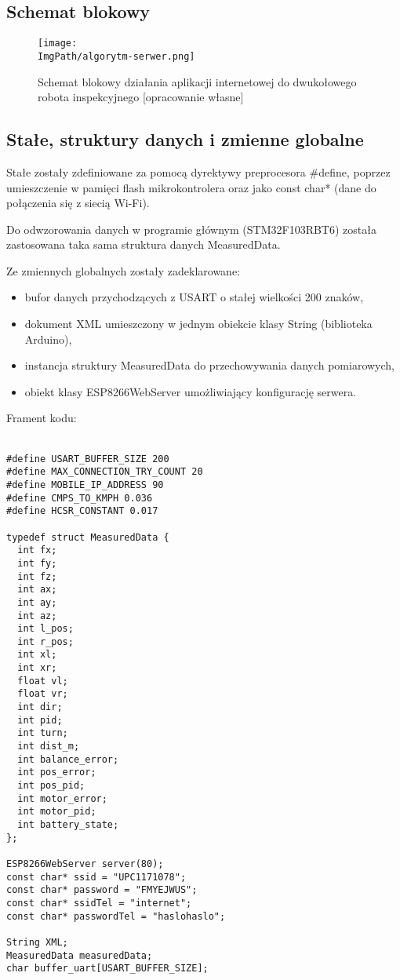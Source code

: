 \documentclass[a4paper,12pt,twoside,openany]{report}
\newcommand{\ImgPath}{.}
\begin{document}
\subsection{Schemat blokowy}

\begin{figure}[!htbp]
	\begin{center}
\centering
\texttt{[image: \\ImgPath/algorytm-serwer.png]}
\end{center}
	\caption{Schemat blokowy działania aplikacji internetowej do dwukołowego robota inspekcyjnego [opracowanie własne]}
	\label{schematKomunikacji}
\end{figure}

\subsection{Stałe, struktury danych i zmienne globalne}

Stałe zostały zdefiniowane za pomocą dyrektywy preprocesora \#define, poprzez umieszczenie w pamięci flash mikrokontrolera oraz jako const char* (dane do połączenia się z siecią Wi-Fi).

Do odwzorowania danych w programie głównym (STM32F103RBT6) została zastosowana taka sama struktura danych MeasuredData.  

Ze zmiennych globalnych zostały zadeklarowane: 
\begin{itemize}
\item bufor danych przychodzących z USART o stałej wielkości 200 znaków,
\item dokument XML umieszczony w jednym obiekcie klasy String (biblioteka Arduino),
\item instancja struktury MeasuredData do przechowywania danych pomiarowych,
\item obiekt klasy ESP8266WebServer umożliwiający konfigurację serwera.
\end{itemize}
Frament kodu:\\
\\
\begin{lstlisting}[style=customcpp]
#define USART_BUFFER_SIZE 200
#define MAX_CONNECTION_TRY_COUNT 20
#define MOBILE_IP_ADDRESS 90
#define CMPS_TO_KMPH 0.036
#define HCSR_CONSTANT 0.017

typedef struct MeasuredData {
  int fx;
  int fy;
  int fz;
  int ax;
  int ay;
  int az;
  int l_pos;
  int r_pos;
  int xl;
  int xr;
  float vl;
  float vr;
  int dir;
  int pid;
  int turn;
  int dist_m;
  int balance_error;
  int pos_error;
  int pos_pid;
  int motor_error;
  int motor_pid;
  int battery_state;
};

ESP8266WebServer server(80);
const char* ssid = "UPC1171078";
const char* password = "FMYEJWUS";
const char* ssidTel = "internet";
const char* passwordTel = "haslohaslo";

String XML;
MeasuredData measuredData;
char buffer_uart[USART_BUFFER_SIZE];
\end{lstlisting}
\end{document}

